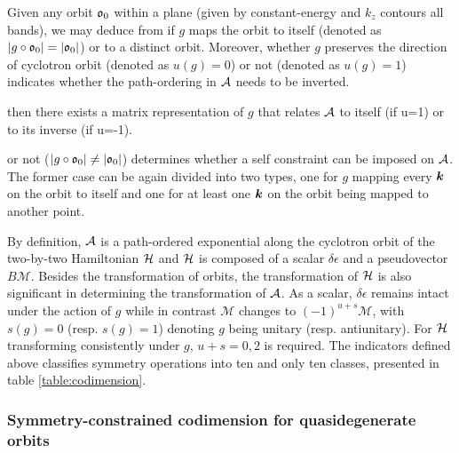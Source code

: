 \documentclass[aps, prb, showpacs, twocolumn, notitlepage, superscriptaddress]{revtex4-1}
\begin{document}


Given any orbit $\mathfrak{o}_0$ within a plane (given by constant-energy and $k_z$ contours all bands), we may deduce from  if  $g$ maps the orbit to itself (denoted as $|g\circ\mathfrak{o}_0|=|\mathfrak{o}_0|$) or to a distinct orbit. Moreover, whether $g$ preserves the direction of cyclotron orbit (denoted as $u(g)=0$) or not (denoted as $u(g)=1$) indicates whether the path-ordering in ${\cal A}$ needs to be inverted. 

then there exists a matrix representation of $g$ that relates ${\cal A}$ to itself (if u=1) or to its inverse (if u=-1).

or not ($|g\circ\mathfrak{o}_0|\ne|\mathfrak{o}_0|$) determines whether a self constraint can be imposed on ${\cal A}$. The former case can be again divided into two types, one for $g$ mapping every $\boldsymbol{k}$ on the orbit to itself and one for at least one $\boldsymbol{k}$ on the orbit being mapped to another point. 
 
 
 By definition, ${\cal A}$ is a path-ordered exponential along the cyclotron orbit of the two-by-two Hamiltonian $\mathcal{H}$ and $\mathcal{H}$ is composed of a scalar $\delta\epsilon$ and a pseudovector $B\mathcal{M}$.
 Besides the transformation of orbits, the transformation of $\mathcal{H}$ is also significant in determining the transformation of ${\cal A}$. As a scalar, $\delta\epsilon$ remains intact under the action of $g$ while in contrast $\mathcal{M}$ changes to $(-1)^{u+s}\mathcal{M}$, with $s(g)=0$ (resp. $s(g)=1$) denoting $g$ being unitary (resp. antiunitary). For $\mathcal{H}$ transforming consistently under $g$, $u+s=0, 2$ is required. The indicators defined above classifies symmetry operations into ten and only ten classes, presented in table \ref{table:codimension}.

\subsubsection{Symmetry-constrained codimension for quasidegenerate orbits}
\end{document}
